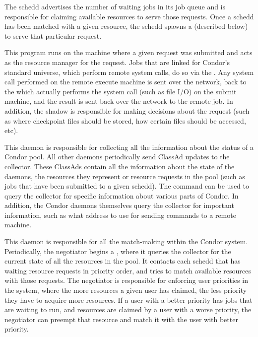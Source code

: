 \begin{description}
The schedd advertises the number of waiting jobs in its job queue and
is responsible for claiming available resources to serve those
requests.  Once a schedd has been matched with a given resource, the
schedd spawns a  (described below) to serve that
particular request.

\item[\Condor{shadow}] This program
runs on the machine where a given
request was submitted and acts as the resource manager for the
request.  Jobs that are linked for Condor's standard universe, which
perform remote system calls, do so via the .  Any
system call performed on the remote execute machine is sent over the
network, back to the  which actually performs the
system call (such as file I/O) on the submit machine, and the result
is sent back over the network to the remote job.  In addition, the
shadow is responsible for making decisions about the request (such as
where checkpoint files should be stored, how certain files should be
accessed, etc).  

\item[\Condor{collector}] This daemon
is responsible for collecting
all the information about the status of a Condor pool.  All other
daemons periodically send ClassAd updates to
the collector.  These ClassAds contain all the information about the
state of the daemons, the resources they represent or resource
requests in the pool (such as jobs that have been submitted to a given
schedd).  The  command can be used to query the
collector for specific information about various parts of Condor.  In
addition, the Condor daemons themselves query the collector for
important information, such as what address to use for sending
commands to a remote machine. 

\item[\Condor{negotiator}] This daemon
is responsible for all the
match-making within the Condor system.  Periodically, the negotiator
begins a , where it queries the collector for
the current state of all the resources in the pool.  It contacts each
schedd that has waiting resource requests in priority order, and tries
to match available resources with those requests.  The negotiator is
responsible for enforcing user priorities in the system, where the
more resources a given user has claimed, the less priority they have
to acquire more resources.  If a user with a better priority has jobs
that are waiting to run, and resources are claimed by a user with a
worse priority, the negotiator can preempt that resource and match it
with the user with better priority.


\end{description}

